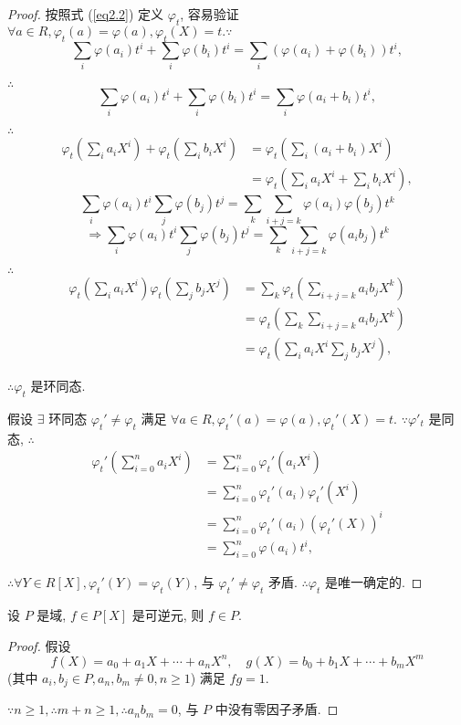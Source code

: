 \documentclass[color=black,device=normal,lang=cn,mode=geye]{elegantnote}
\begin{document}
\begin{proof}
    按照式 (\ref{eq2.2}) 定义 $\varphi_t$, 容易验证 $\forall a\in R,\varphi_t(a)=\varphi(a),\varphi_t(X)=t.\because$
    \[\sum\limits_i\varphi(a_i)t^i+\sum\limits_i\varphi(b_i)t^i=\sum\limits_i(\varphi(a_i)+\varphi(b_i))t^i,\]
    
    $\therefore$
    \[\sum\limits_i\varphi(a_i)t^i+\sum\limits_i\varphi(b_i)t^i=\sum\limits_i\varphi(a_i+b_i)t^i,\]
    
    $\therefore$
    \begin{align*}
        \varphi_t\left(\sum\limits_ia_iX^i\right)+\varphi_t\left(\sum\limits_ib_iX^i\right) & =\varphi_t\left(\sum\limits_i(a_i+b_i)X^i\right) \\
        & =\varphi_t\left(\sum\limits_ia_iX^i+\sum\limits_ib_iX^i\right),
    \end{align*}
    \[\sum\limits_i\varphi(a_i)t^i\sum\limits_j\varphi(b_j)t^j=\sum\limits_k\sum\limits_{i+j=k}\varphi(a_i)\varphi(b_j)t^k\]
    \[\Rightarrow\sum\limits_i\varphi(a_i)t^i\sum\limits_j\varphi(b_j)t^j=\sum\limits_k\sum\limits_{i+j=k}\varphi(a_ib_j)t^k\]
    
    $\therefore$
    \begin{align*}
        \varphi_t\left(\sum\limits_ia_iX^i\right)\varphi_t\left(\sum\limits_jb_jX^j\right) & =\sum\limits_k\varphi_t\left(\sum\limits_{i+j=k}a_ib_jX^k\right) \\
        & =\varphi_t\left(\sum\limits_k\sum\limits_{i+j=k}a_ib_jX^k\right) \\
        & =\varphi_t\left(\sum\limits_ia_iX^i\sum\limits_jb_jX^j\right),
    \end{align*}

    $\therefore\varphi_t$ 是环同态.

    假设 $\exists$ 环同态 $\varphi_t'\neq\varphi_t$ 满足 $\forall a\in R,\varphi_t'(a)=\varphi(a),\varphi_t'(X)=t$. $\because\varphi'_t$ 是同态, $\therefore$
    \begin{align*}
        \varphi_t'\left(\sum\limits_{i=0}^{n}a_iX^i\right) & =\sum\limits_{i=0}^{n}\varphi_t'\left(a_iX^i\right) \\
        & =\sum\limits_{i=0}^{n}\varphi_t'(a_i)\varphi_t'\left(X^i\right) \\
        & =\sum\limits_{i=0}^{n}\varphi_t'(a_i)(\varphi_t'(X))^i \\
        & =\sum\limits_{i=0}^{n}\varphi(a_i)t^i,
    \end{align*}

    $\therefore\forall Y\in R[X],\varphi_t'(Y)=\varphi_t(Y)$, 与 $\varphi_t'\neq\varphi_t$ 矛盾. $\therefore\varphi_t$ 是唯一确定的.
\end{proof}
\begin{theorem}
    设 $P$ 是域, $f\in P[X]$ 是可逆元, 则 $f\in P$.
\end{theorem}
\begin{proof}
    假设
    \[f(X)=a_0+a_1X+\cdots+a_nX^n,\quad g(X)=b_0+b_1X+\cdots+b_mX^m\]
    (其中 $a_i,b_j\in P,a_n,b_m\neq0,n\geq1$) 满足 $fg=1$.

    $\because n\geq1,\therefore m+n\geq1,\therefore a_nb_m=0$, 与 $P$ 中没有零因子矛盾.
\end{proof}
\end{document}
